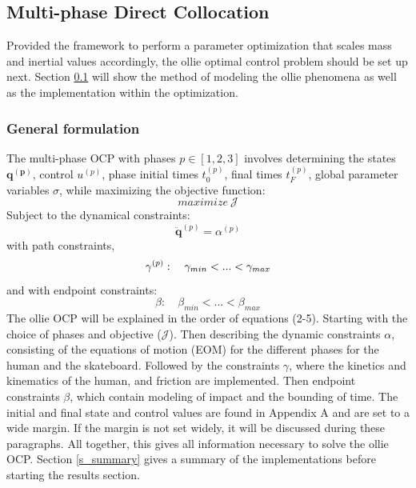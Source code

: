 \subsection{Multi-phase Direct Collocation}\label{s_multiphase}
\noindent Provided the framework to perform a parameter optimization that scales mass and inertial values accordingly, the ollie optimal control problem should be set up next. Section \ref{s_multiphase} will show the method of modeling the ollie phenomena as well as the implementation within the optimization.

\newpage
\subsubsection{General formulation}
\noindent The multi-phase OCP with phases $p \in [1,2,3]$ involves determining the states $\mathbf{q^{(p)}}$, control $u^{(p)}$, phase initial times $t_0^{(p)}$, final times $t_F^{(p)}$, global parameter variables $\sigma$, while maximizing the objective function:
\begin{equation}
    maximize\ \mathcal{J}
\end{equation} 
Subject to the dynamical constraints:
\begin{equation}
\ddot{\mathbf{q}}^{(p)}=\alpha^{(p)}
\end{equation}
with path constraints,
\begin{equation}
        \gamma^{(p)}:\quad \gamma_{min} < ... < \gamma_{max}\\
\end{equation}
and with endpoint constraints:
\begin{equation}
    \beta:\quad \beta_{min} < ... < \beta_{max}
\end{equation}
The ollie OCP will be explained in the order of equations (2-5). Starting with the choice of phases and objective ($\mathcal{J}$). Then describing the dynamic constraints $\alpha$, consisting of the equations of motion (EOM) for the different phases for the human and the skateboard. Followed by the constraints $\gamma$, where the kinetics and kinematics of the human, and friction are implemented. Then endpoint constraints $\beta$, which contain modeling of impact and the bounding of time. The initial and final state and control values are found in Appendix A and are set to a wide margin. If the margin is not set widely, it will be discussed during these paragraphs. All together, this gives all information necessary to solve the ollie OCP. Section \ref{s_summary} gives a summary of the implementations before starting the results section.


